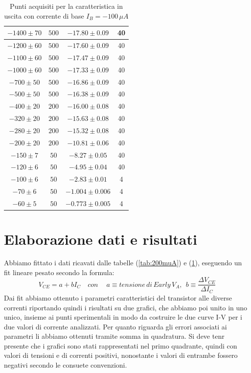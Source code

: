 \documentclass[]{article}
\begin{document}
\begin{table}[H]
\begin{tabular}{|c|c|c|c|}
		\hline
		$ -1400\pm 70 $ &$ 500 $ & $ -17.80\pm 0.09 $ &40 \\
		\hline
		$ -1200\pm 60 $ &$ 500 $ & $ -17.60\pm 0.09 $ &40 \\
		\hline
		$ -1100\pm 60 $ &$ 500 $ & $ -17.47\pm 0.09 $ &40 \\
		\hline
		$ -1000\pm 60 $ &$ 500 $ & $ -17.33\pm 0.09 $ &40 \\
		\hline
		$ -700\pm 50 $ &$ 500 $ & $ -16.86\pm 0.09 $ &40 \\
		\hline
		$ -500\pm 50 $ &$ 500 $ & $ -16.38\pm 0.09 $ &40 \\
		\hline
		$ -400\pm 20 $ &$ 200 $ & $ -16.00\pm 0.08 $ &40 \\
		\hline
		$ -320\pm 20 $ &$ 200 $ & $-15.63\pm 0.08 $ &40 \\
		\hline
		$-280\pm 20 $ &$ 200 $ & $ -15.32\pm 0.08 $ &40 \\
		\hline
		$ -200\pm 20 $ &$ 200 $ & $ -10.81\pm 0.06 $ &40 \\
		\hline
		$ -150\pm 7 $ &$ 50 $ & $ -8.27\pm 0.05 $ &40 \\
		\hline
		$ -120\pm 6 $ &$ 50 $ & $ -4.95\pm 0.04 $ &40 \\
		\hline
		$ -100\pm 6 $ &$ 50 $ & $ -2.83\pm 0.01 $ &4 \\
		\hline
		$ -70\pm 6 $ &$ 50 $ & $ -1.004\pm 0.006 $ &4 \\
		\hline
		$ -60\pm 5 $ &$ 50 $ & $ -0.773\pm 0.005 $ &4 \\
		\hline
	\end{tabular}
\caption{Punti acquisiti per la caratteristica in uscita con corrente di base $ I_{B}= -100\, \mu A $}
\label{tab:100muA}
\end{table}
\section{Elaborazione dati e risultati}

Abbiamo fittato i dati ricavati dalle tabelle (\ref{tab:200muA}) e (\ref{tab:100muA}), eseguendo un fit lineare pesato secondo la formula: 
\begin{equation}
	V_{CE}=a+bI_{C} \quad con\quad \:a\equiv tensione\, di\, Early \,V_{A},\:\: b\equiv\frac{\Delta V_{CE}}{\Delta I_{C}}
	\label{fitlin}
\end{equation}
Dai fit abbiamo ottenuto i parametri caratteristici del transistor alle diverse correnti riportando quindi i risultati su due grafici, che abbiamo poi unito in uno unico, insieme ai punti sperimentali in modo da costruire le due curve I-V per i due valori di corrente analizzati. Per quanto riguarda gli errori associati ai parametri li abbiamo ottenuti tramite somma in quadratura. Si deve tenr presente che i grafici sono stati rappresentati nel primo quadrante, quindi con valori di tensioni e di correnti positivi, nonostante i valori di entrambe fossero negativi secondo le consuete convenzioni.
\end{document}
